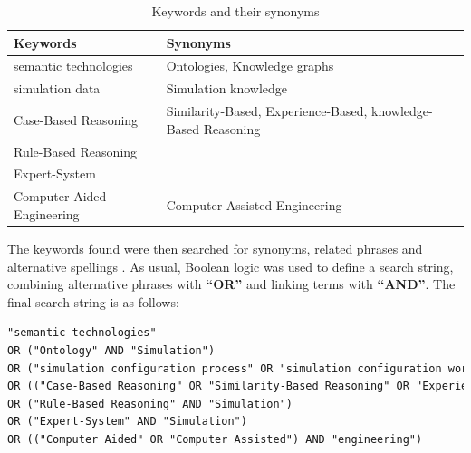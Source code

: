             \begin{table}[h]
                \centering
        	    {
        	    \begin{tabular}{ | m{5.5cm} | m{9cm} | }
                    \hline
                    \rowcolor{teal!30} Keywords & Synonyms \\
                    
                    \hline
                    semantic technologies  & Ontologies, Knowledge graphs\\
                    
                    \hline
                    simulation data & Simulation knowledge\\
                    
                    \hline
                    Case-Based Reasoning  & Similarity-Based, Experience-Based, knowledge-Based Reasoning\\
                    
                    \hline
                    Rule-Based Reasoning  & \\
                    
                    \hline
                    Expert-System  & \\
                    
                    \hline
                    Computer Aided Engineering  & Computer Assisted Engineering\\
                    
                    \hline
                \end{tabular}}
                \caption{\label{tab:keyw-syno} Keywords and their synonyms}
            \end{table}

            The keywords found were then searched for synonyms, related phrases and alternative spellings \cite{budgen2006performing}. As usual, Boolean logic was used to define a search string, combining alternative phrases with \textbf{“OR”} and linking terms with \textbf{“AND”}. The final search string is as follows:\\

            \begin{lstlisting}[language=XML, caption=Generated Query, label={lst:gen-query}]
"semantic technologies" 
OR ("Ontology" AND "Simulation")
OR ("simulation configuration process" OR "simulation configuration workflow" OR "simulation configuration knowledge")
OR (("Case-Based Reasoning" OR "Similarity-Based Reasoning" OR "Experience-Based Reasoning" OR "knowledge-Based Reasoning") AND "Simulation")
OR ("Rule-Based Reasoning" AND "Simulation")
OR ("Expert-System" AND "Simulation")
OR (("Computer Aided" OR "Computer Assisted") AND "engineering")
            \end{lstlisting}

